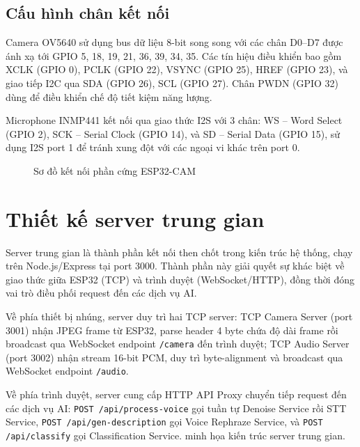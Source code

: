 \subsection{Cấu hình chân kết nối}

Camera OV5640 sử dụng bus dữ liệu 8-bit song song với các chân D0--D7 được ánh
xạ tới GPIO 5, 18, 19, 21, 36, 39, 34, 35. Các tín hiệu điều khiển bao gồm
XCLK (GPIO 0), PCLK (GPIO 22), VSYNC (GPIO 25), HREF (GPIO 23), và giao tiếp
I2C qua SDA (GPIO 26), SCL (GPIO 27). Chân PWDN (GPIO 32) dùng để điều khiển
chế độ tiết kiệm năng lượng.

Microphone INMP441 kết nối qua giao thức I2S với 3 chân: WS -- Word Select
(GPIO 2), SCK -- Serial Clock (GPIO 14), và SD -- Serial Data (GPIO 15),
sử dụng I2S port 1 để tránh xung đột với các ngoại vi khác trên port 0.

\begin{figure}[htbp]
\centering
{}
\caption{Sơ đồ kết nối phần cứng ESP32-CAM}
\label{fig:wiring-diagram}
\end{figure}

\designDenoise
\designVoice
\designClassify

\section{Thiết kế server trung gian}

Server trung gian là thành phần kết nối then chốt trong kiến trúc hệ thống,
chạy trên Node.js/Express tại port 3000. Thành phần này giải quyết sự khác
biệt về giao thức giữa ESP32 (TCP) và trình duyệt (WebSocket/HTTP), đồng
thời đóng vai trò điều phối request đến các dịch vụ AI.

Về phía thiết bị nhúng, server duy trì hai TCP server: TCP Camera Server
(port 3001) nhận JPEG frame từ ESP32, parse header 4 byte chứa độ dài frame
rồi broadcast qua WebSocket endpoint \texttt{/camera} đến trình duyệt;
TCP Audio Server (port 3002) nhận stream 16-bit PCM, duy trì byte-alignment
và broadcast qua WebSocket endpoint \texttt{/audio}.

Về phía trình duyệt, server cung cấp HTTP API Proxy chuyển tiếp request đến
các dịch vụ AI: \texttt{POST /api/process-voice} gọi tuần tự Denoise Service
rồi STT Service, \texttt{POST /api/gen-description} gọi Voice Rephraze Service,
và \texttt{POST /api/classify} gọi Classification Service.
 minh họa kiến trúc server trung gian.

